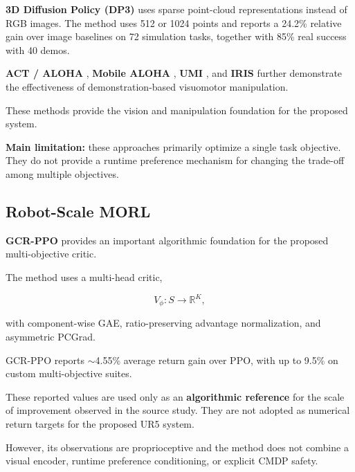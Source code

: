\documentclass[journal]{IEEEtran}
\begin{document}
\textbf{3D Diffusion Policy (DP3)} \cite{ze2024} uses sparse point-cloud
representations instead of RGB images. The method uses 512 or 1024
points and reports a 24.2\% relative gain over image baselines on
72 simulation tasks, together with 85\% real success with 40 demos.

\textbf{ACT / ALOHA} \cite{zhao2023},
\textbf{Mobile ALOHA} \cite{fu2024},
\textbf{UMI} \cite{chi2024}, and
\textbf{IRIS} \cite{jiang2025} further demonstrate the effectiveness of
demonstration-based visuomotor manipulation.

These methods provide the vision and manipulation foundation for the
proposed system.

\textbf{Main limitation:} these approaches primarily optimize a
single task objective. They do not provide a runtime preference
mechanism for changing the trade-off among multiple objectives.


\subsection{Robot-Scale MORL}

\textbf{GCR-PPO} \cite{munn2025} provides an important algorithmic
foundation for the proposed multi-objective critic.

The method uses a multi-head critic,

\begin{equation}
V_{\phi}:S\rightarrow\mathbb{R}^{K},
\end{equation}

with component-wise GAE, ratio-preserving advantage normalization, and
asymmetric PCGrad.

GCR-PPO reports $\sim$4.55\% average return gain over PPO, with up to
9.5\% on custom multi-objective suites.

These reported values are used only as an \textbf{algorithmic reference}
for the scale of improvement observed in the source study. They are
not adopted as numerical return targets for the proposed UR5 system.

However, its observations are proprioceptive and the method does not
combine a visual encoder, runtime preference conditioning, or explicit
CMDP safety.

\end{document}
